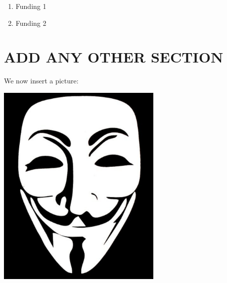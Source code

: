 \documentclass[11pt, a4paper]{moderncv} %
\begin{document}
    \begin{enumerate}
        \item Funding 1
        \item Funding 2
    \end{enumerate}

\closesection


\section{ADD ANY OTHER SECTION}
We now insert a picture: %

\centering
\includegraphics[width=8cm]{picture1.png} %
\end{document}
